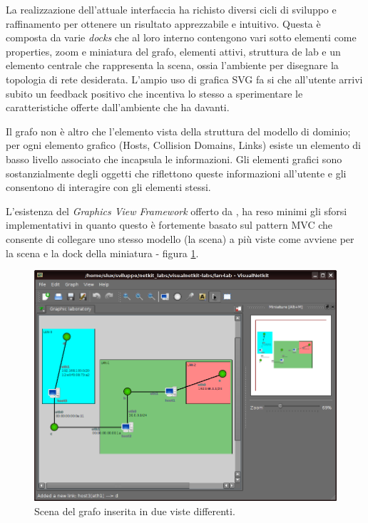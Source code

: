 La realizzazione dell'attuale interfaccia ha richisto diversi cicli di sviluppo e raffinamento per ottenere un risultato apprezzabile e intuitivo. Questa è composta da varie \emph{docks} che al loro interno contengono vari sotto elementi come properties, zoom e miniatura del grafo, elementi attivi, struttura de lab e un elemento centrale che rappresenta la scena, ossia l'ambiente per disegnare la topologia di rete desiderata. L'ampio uso di grafica SVG fa si che all'utente arrivi subito un feedback positivo che incentiva lo stesso a sperimentare le caratteristiche offerte dall'ambiente che ha davanti.

Il grafo non è altro che l'elemento vista della struttura del modello di dominio; per ogni elemento grafico (Hosts, Collision Domains, Links) esiste un elemento di basso livello associato che incapsula le informazioni. Gli elementi grafici sono sostanzialmente degli oggetti che riflettono queste informazioni all'utente e gli consentono di interagire con gli elementi stessi.

L'esistenza del \emph{Graphics View Framework} offerto da \qt{}, ha reso minimi gli sforsi implementativi in quanto questo è fortemente basato sul pattern MVC che consente di collegare uno stesso modello (la scena) a più viste come avviene per la scena e la dock della miniatura - figura \ref{figura:vnetkit_graphics_view_1}.

\begin{figure}[!htb]
	\centering
	\includegraphics[width=12cm]{images/visualnetkit_graphics_view_1.png}
	\caption{Scena del grafo inserita in due viste differenti.}
	\label{figura:vnetkit_graphics_view_1}
\end{figure}

